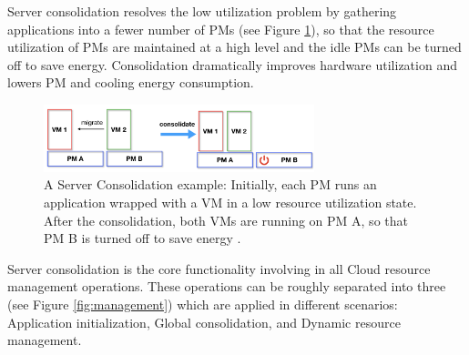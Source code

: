 Server consolidation \cite{Zhang:2010vo} resolves the low utilization problem by gathering applications into a fewer number of PMs (see Figure \ref{fig:unproportional}), so that the resource utilization of PMs are maintained at a high level and the idle PMs can be turned off to save energy. Consolidation dramatically improves hardware utilization and lowers PM and cooling energy consumption. 


\begin{figure}
	\centering
	\includegraphics[width=0.7\textwidth]{pics/consolidate.png}
	\caption{A Server Consolidation example: Initially, each PM runs an application wrapped with a VM in a low resource utilization state. After the consolidation, both VMs are running on PM A, so that PM B is turned off to save energy \cite{Barroso:2007jt}.}
	\label{fig:unproportional}
\end{figure} 

Server consolidation is the core functionality involving in all Cloud resource management operations. These operations can be roughly separated into three \cite{Svard:2015ic, Mishra:2012kx} (see Figure \ref{fig:management}) which are applied in different scenarios: Application initialization, Global consolidation, and Dynamic resource management. 

